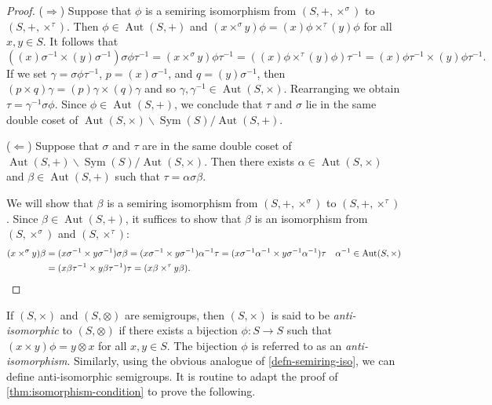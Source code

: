 \documentclass{article}
\theoremstyle{definition}
\theoremstyle{plain}
\newcommand{\Sym}{\operatorname{Sym}}
\newcommand{\Aut}{\operatorname{Aut}}
\begin{document}
\begin{proof}
  ($\Rightarrow$) Suppose that $\phi$ is a semiring isomorphism from
  $(S, +, \times ^ \sigma)$ to $(S, +, \times^\tau)$. Then
  $\phi \in \Aut(S, +)$ and $(x \times ^ \sigma y)\phi = (x)\phi\times ^ \tau
  (y)\phi$ for all $x, y\in S$. It follows that
  \[
    ((x)\sigma ^ {-1} \times (y)\sigma ^ {-1})\sigma \phi \tau ^ {-1} =
    (x \times ^ \sigma y)\phi\tau ^ {-1}
    = ((x)\phi \times ^ {\tau} (y)\phi)\tau ^ {-1}
    = (x)\phi\tau ^ {-1} \times (y)\phi\tau ^ {-1}.
  \]
  If we set $\gamma = \sigma\phi\tau^{-1}$, $p =
  (x)\sigma^{-1}$, and $q=(y)\sigma^{-1}$, then
  $(p\times q)\gamma = (p)\gamma \times (q)\gamma$
  and so $\gamma, \gamma ^ {-1} \in \Aut(S, \times)$.
  Rearranging we obtain $\tau = \gamma^{-1}\sigma\phi$. Since $\phi \in
  \Aut(S, +)$, we conclude that $\tau$ and $\sigma$ lie in the
  same double coset of $\Aut(S, \times) \backslash \Sym(S) / \Aut(S, +)$.

  ($\Leftarrow$) Suppose that $\sigma$ and $\tau$ are in the
  same double coset of $\Aut(S, +) \backslash \Sym(S) / \Aut(S, \times)$.
  Then there exists $\alpha\in\Aut(S, \times)$ and $\beta\in\Aut(S, +)$ such
  that $\tau=\alpha\sigma\beta$.

  We will show that $\beta$ is a semiring isomorphism from $(S, +, \times
  ^{\sigma})$ to $(S, +, \times^{\tau})$. Since $\beta\in \Aut(S, +)$, it
  suffices to show that $\beta$ is an isomorphism from $(S, \times
  ^{\sigma})$ and $(S, \times^{\tau})$:
  \begin{align*}
    (x\times^\sigma y)\beta
    &= (x\sigma ^{-1} \times y\sigma ^{-1})\sigma \beta
    = (x\sigma ^{-1} \times y\sigma ^{-1})\alpha^{-1}\tau
    = (x\sigma ^{-1}\alpha^{-1} \times y\sigma ^{-1}\alpha^{-1})\tau &&
    \alpha^{-1} \in \Aut(S, \times)\\
    &= (x\beta\tau^{-1} \times y\beta\tau^{-1})\tau
    = (x\beta \times^{\tau} y\beta).\qedhere
  \end{align*}
\end{proof}

If $(S, \times)$ and $(S, \otimes)$ are semigroups, then $(S, \times)$ is said
to be \textit{anti-isomorphic} to $(S, \otimes)$ if there exists a bijection
$\phi: S \to S$ such that $(x\times y)\phi = y\otimes x$ for all $x, y\in S$.
The bijection $\phi$ is referred to as an \textit{anti-isomorphism}. Similarly,
using the obvious analogue of \cref{defn-semiring-iso}, we can define
anti-isomorphic semigroups. It is routine to adapt the proof of
\cref{thm:isomorphism-condition} to prove the following.
\end{document}
